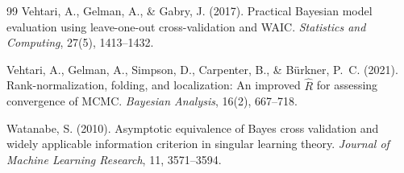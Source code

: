 \documentclass[11pt,a4paper]{article}
\begin{document}
\begin{thebibliography}{99}
Vehtari, A., Gelman, A., \& Gabry, J. (2017).
\newblock Practical Bayesian model evaluation using leave-one-out cross-validation and WAIC.
\newblock \textit{Statistics and Computing}, 27(5), 1413--1432.

Vehtari, A., Gelman, A., Simpson, D., Carpenter, B., \& B{\"u}rkner, P.~C. (2021).
\newblock Rank-normalization, folding, and localization: An improved $\hat R$ for assessing convergence of MCMC.
\newblock \textit{Bayesian Analysis}, 16(2), 667--718.

Watanabe, S. (2010).
\newblock Asymptotic equivalence of Bayes cross validation and widely applicable information criterion in singular learning theory.
\newblock \textit{Journal of Machine Learning Research}, 11, 3571--3594.

\end{thebibliography}
\end{document}
